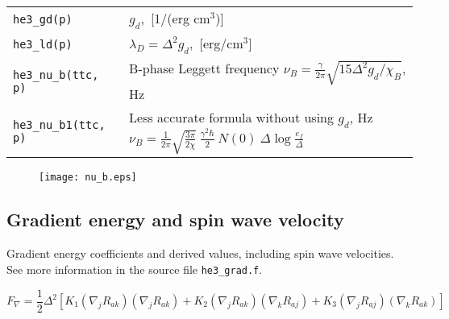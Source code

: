 \documentclass[a4paper]{article}
\begin{document}
\medskip
\noindent\begin{tabular}{lp{11cm}}
\tt he3\_gd(p) & $g_d$,~[1/(erg cm$^3$)]\\
\tt he3\_ld(p) & $\lambda_D = \Delta^2 g_d$,~[erg/cm$^3$]\\
\tt he3\_nu\_b(ttc, p) &B-phase Leggett frequency
                             $\displaystyle \nu_B = \frac{\gamma}{2\pi}
                               \sqrt{15 \Delta^2 g_d/\chi_B}$, Hz\\

\tt he3\_nu\_b1(ttc, p)  & Less accurate formula without using $g_d$, Hz\newline
                             $\displaystyle \nu_B =\frac{1}{2\pi}\sqrt{\frac{3\pi}{2\chi}}
                             \ \frac{\gamma^2\hbar}{2}\ N(0)\ \Delta \log\frac{e_f}{\Delta}$\\
\end{tabular}
\medskip

\begin{figure}[h]
\texttt{[image: nu\_b.eps]}\\
\end{figure}

\eject
\subsection*{Gradient energy and spin wave velocity}

Gradient energy coefficients and derived values, including spin wave
velocities. See more information in the source file {\tt he3\_grad.f}.

$$
F_\nabla = \frac12 \Delta^2 \left[
  K_1 (\nabla_j R_{ak})(\nabla_j R_{ak})
+ K_2 (\nabla_j R_{ak})(\nabla_k R_{aj})
+ K_3 (\nabla_j R_{aj})(\nabla_k R_{ak}) \right]
$$

\end{document}
